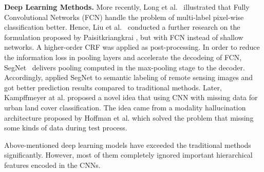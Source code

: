 \noindent\textbf{Deep Learning Methods.} More recently, Long et al.~\cite{IEEEexample:Long_2015_CVPR} illustrated that Fully Convolutional Networks (FCN) handle the problem of multi-label pixel-wise classification better.
Hence, Liu et al.~\cite{IEEEexample:liu2017dense} conducted a further research on the formulation proposed by Paisitkriangkrai \cite{IEEEexample:paisitkriangkrai2015effective}, but with FCN instead of shallow networks.
A higher-order CRF was applied as post-processing.
In order to reduce the information loss in pooling layers and accelerate the decodeing of FCN, SegNet~\cite{IEEEexample:badrinarayanan2017segnet} delivers pooling  computed in the max-pooling stage to the decoder.
%
Accordingly,  applied SegNet  to semantic labeling of remote sensing images and got better prediction results compared to traditional methods.
Later, Kampffmeyer at al. \cite{IEEEexample:kampffmeyer2017urban} proposed a novel idea that using CNN with missing data for urban land cover classification.
The idea came from a modality hallucination architecture proposed by Hoffman et al. \cite{IEEEexample:hoffman2016learning} which solved the problem that missing some kinds of data during test process.


Above-mentioned deep learning models have exceeded the traditional methods significantly.
However, most of them completely ignored important hierarchical features encoded in the CNNs.


